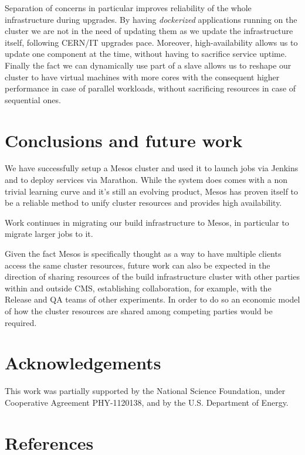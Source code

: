 \documentclass[a4paper]{jpconf}
\begin{document}
Separation of concerns in particular improves reliability of the whole
infrastructure during upgrades. By having \textit{dockerized}
applications running on the cluster we are not in the need of updating
them as we update the infrastructure itself, following CERN/IT upgrades
pace. Moreover, high-availability allows us to update one component at
the time, without having to sacrifice service uptime. Finally the fact
we can dynamically use part of a slave allows us to reshape our cluster
to have virtual machines with more cores with the consequent higher
performance in case of parallel workloads, without sacrificing resources
in case of sequential ones.

\section{Conclusions and future work}

We have successfully setup a Mesos cluster and used it to launch jobs via
Jenkins and to deploy services via Marathon. While the system does comes with a
non trivial learning curve and it's still an evolving product, Mesos has proven
 itself to be a reliable method to unify cluster resources and provides high
availability.

Work continues in migrating our build infrastructure to Mesos, in particular
to migrate larger jobs to it.

Given the fact Mesos is specifically thought as a way to have multiple
clients access the same cluster resources, future work can also
be expected in the direction of sharing resources of the build
infrastructure cluster with other parties within and outside CMS,
establishing collaboration, for example, with the Release and QA teams
of other experiments. In order to do so an economic model of how the
cluster resources are shared among competing parties would be required.

\section*{Acknowledgements}
This work was partially supported by the National Science Foundation, under
Cooperative Agreement PHY-1120138, and by the U.S. Department of Energy.

\section*{References}


\end{document}
